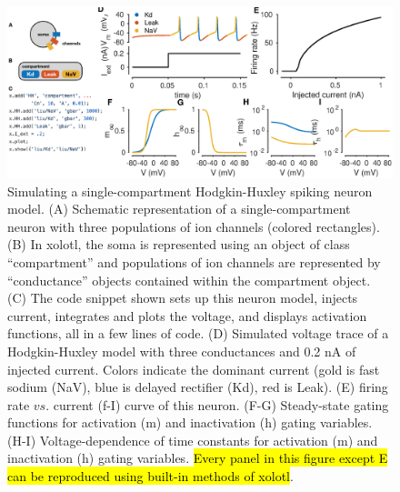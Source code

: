 \documentclass{frontiersSCNS} %
\begin{document}
\begin{figure}
	\centering
	\includegraphics[width=1.0\linewidth]{gfx/figure_HH}
	\caption{Simulating a single-compartment Hodgkin-Huxley spiking neuron model. (A) Schematic representation of a single-compartment neuron with three populations of ion channels (colored rectangles). (B) In xolotl, the soma is represented using an object of class ``compartment'' and populations of ion channels are represented by ``conductance'' objects contained within the compartment object. (C) The code snippet shown sets up this neuron model, injects current, integrates and plots the voltage, and displays activation functions, all in a few lines of code. (D) Simulated voltage trace of a Hodgkin-Huxley model with three conductances and 0.2 nA of injected current. Colors indicate the dominant current (gold is fast sodium (NaV), blue is delayed rectifier (Kd), red is Leak). (E) firing rate $vs$. current (f-I) curve of this neuron. (F-G) Steady-state gating functions for activation (m) and inactivation (h) gating variables. (H-I) Voltage-dependence of time constants for activation (m) and inactivation (h) gating variables. \hl{Every panel in this figure except E can be reproduced using built-in methods of xolotl}.}
	\label{fig:figurehh}
\end{figure}
\end{document}
